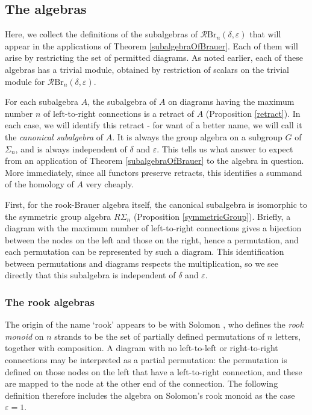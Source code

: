 \documentclass[12pt]{amsart}
\theoremstyle{plain}
\theoremstyle{definition} \newtheorem{definition}[theorem]{Definition}
\theoremstyle{plain}
\theoremstyle{plain} \newtheorem{proposition}[theorem]{Proposition}
\theoremstyle{plain} \newtheorem{conjecture}[theorem]{Conjecture}
\theoremstyle{plain} \newtheorem{corollary}[theorem]{Corollary}
\theoremstyle{remark} \newtheorem{claim}[theorem]{Claim}
\theoremstyle{remark} \newtheorem{remark}[theorem]{Remark}
\theoremstyle{remark} \newtheorem{example}[theorem]{Example}
\theoremstyle{remark} \newtheorem{comment}[theorem]{Comment}
\theoremstyle{definition} \newtheorem{question}[theorem]{Question}
\newcommand{\rook}{\mathcal{R}}
\newcommand{\Brauer}{\mathrm{Br}}
\newcommand{\maxTpt}{canonical}
\begin{document}
\subsection{The algebras}

Here, we collect the definitions of the subalgebras of $\rook \Brauer_n(\delta, \varepsilon)$ that will appear in the applications of Theorem \ref{subalgebraOfBrauer}. Each of them will arise by restricting the set of permitted diagrams. As noted earlier, each of these algebras has a trivial module, obtained by restriction of scalars on the trivial module for $\rook \Brauer_n(\delta, \varepsilon)$.

For each subalgebra $A$, the subalgebra of $A$ on diagrams having the maximum number $n$ of left-to-right connections is a retract of $A$ (Proposition \ref{retract}). In each case, we will identify this retract - for want of a better name, we will call it the \emph{{\maxTpt} subalgebra} of $A$. It is always the group algebra on a subgroup $G$ of $\Sigma_n$, and is always independent of $\delta$ and $\varepsilon$. This tells us what answer to expect from an application of Theorem \ref{subalgebraOfBrauer} to the algebra in question. More immediately, since all functors preserve retracts, this identifies a summand of the homology of $A$ very cheaply.

First, for the rook-Brauer algebra itself, the {\maxTpt} subalgebra is isomorphic to the symmetric group algebra $R \Sigma_n$ (Proposition \ref{symmetricGroup}). Briefly, a diagram with the maximum number of left-to-right connections gives a bijection between the nodes on the left and those on the right, hence a permutation, and each permutation can be represented by such a diagram. This identification between permutations and diagrams respects the multiplication, so we see directly that this subalgebra is independent of $\delta$ and $\varepsilon$.

\subsubsection{The rook algebras}

The origin of the name `rook' appears to be with Solomon \cite{Solomon}, who defines the \emph{rook monoid} on $n$ strands to be the set of partially defined permutations of $n$ letters, together with composition. A diagram with no left-to-left or right-to-right connections may be interpreted as a partial permutation: the permutation is defined on those nodes on the left that have a left-to-right connection, and these are mapped to the node at the other end of the connection. The following definition therefore includes the algebra on Solomon's rook monoid as the case $\varepsilon=1$.
\end{document}

